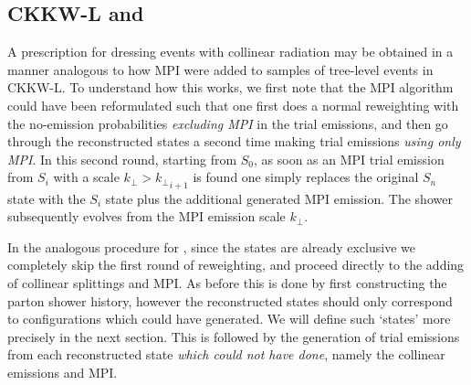 

\subsection{CKKW-L and \HEJ}
\label{sec:ckkw-l-hej}

A prescription for dressing \HEJ events with collinear radiation may be 
obtained in a manner analogous to how MPI were added to samples of tree-level
events in CKKW-L. To understand how this works, we first note that the MPI algorithm
could have been reformulated such that one first does a normal reweighting
with the no-emission probabilities \textit{excluding MPI} in the trial
emissions, and then go through the reconstructed states
a second time making trial emissions \textit{using only MPI}. In this second
round, starting from $S_0$, as soon as an MPI trial emission from
$S_i$ with a scale $k_\perp > {k_\perp}_{i+1}$ is found one simply
replaces the original $S_n$ state with the $S_i$ state plus the
additional generated MPI emission. The shower subsequently evolves from 
the MPI emission scale $k_\perp$.

In the analogous procedure for \HEJ, since the states are already
exclusive we completely skip the first round of reweighting, and
proceed directly to the adding of collinear splittings and MPI.  As
before this is done by first constructing the parton shower history,
however the reconstructed states should only correspond to
configurations which \HEJ could have generated. We will define such
`\HEJ states' more precisely in the next section.  This is followed by the generation
of trial emissions from each reconstructed state \textit{which \HEJ
  could not have done}, namely the collinear emissions and MPI. 

